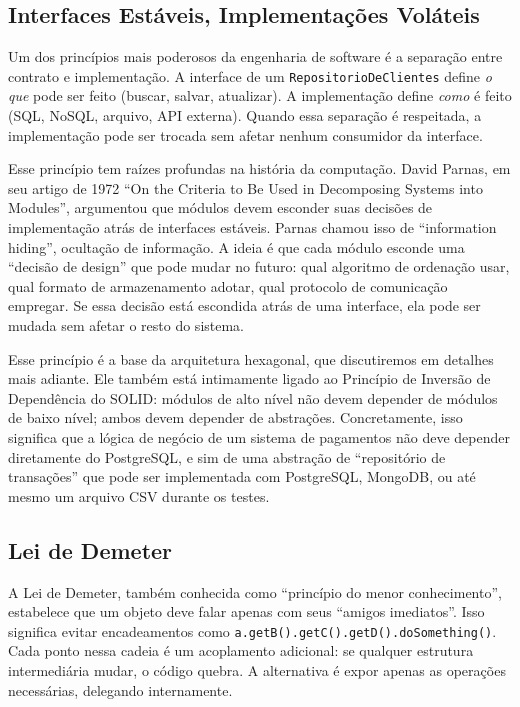 \subsection{Interfaces Estáveis, Implementações Voláteis}

Um dos princípios mais poderosos da engenharia de software é a separação entre
contrato e implementação. A interface de um \texttt{RepositorioDeClientes} define
\textit{o que} pode ser feito (buscar, salvar, atualizar). A implementação define
\textit{como} é feito (SQL, NoSQL, arquivo, API externa). Quando essa separação
é respeitada, a implementação pode ser trocada sem afetar nenhum consumidor da
interface.

Esse princípio tem raízes profundas na história da computação. David Parnas, em
seu artigo de 1972 ``On the Criteria to Be Used in Decomposing Systems into
Modules'', argumentou que módulos devem esconder suas decisões de implementação
atrás de interfaces estáveis. Parnas chamou isso de ``information hiding'',
ocultação de informação. A ideia é que cada módulo esconde uma ``decisão de
design'' que pode mudar no futuro: qual algoritmo de ordenação usar, qual formato
de armazenamento adotar, qual protocolo de comunicação empregar. Se essa decisão
está escondida atrás de uma interface, ela pode ser mudada sem afetar o resto
do sistema.

Esse princípio é a base da arquitetura hexagonal, que discutiremos em detalhes
mais adiante. Ele também está intimamente ligado ao Princípio de Inversão de
Dependência do SOLID: módulos de alto nível não devem depender de módulos de
baixo nível; ambos devem depender de abstrações. Concretamente, isso significa que
a lógica de negócio de um sistema de pagamentos não deve depender diretamente
do PostgreSQL, e sim de uma abstração de ``repositório de transações''
que pode ser implementada com PostgreSQL, MongoDB, ou até mesmo um arquivo CSV
durante os testes.

\subsection{Lei de Demeter}

A Lei de Demeter, também conhecida como ``princípio do menor conhecimento'',
estabelece que um objeto deve falar apenas com seus ``amigos imediatos''. Isso
significa evitar encadeamentos como
\texttt{a.getB().getC().getD().doSomething()}. Cada ponto nessa cadeia é um
acoplamento adicional: se qualquer estrutura intermediária mudar, o código
quebra. A alternativa é expor apenas as operações necessárias, delegando
internamente.

